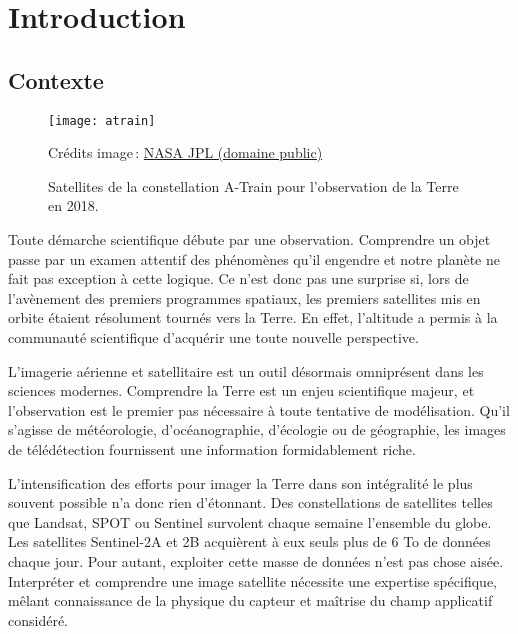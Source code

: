 \chapter{Introduction}
\label{chap:intro}
	\minitoc
	\newpage

\section{Contexte}

\begin{figure}[h]
	\texttt{[image: atrain]}
	\caption{Satellites de la constellation A-Train pour l'observation de la Terre en 2018.}
	{\small Crédits image\,: \href{https://commons.wikimedia.org/w/index.php?curid=33645603}{NASA JPL (domaine public)}}
	\label{fig:atrain}
\end{figure}

Toute démarche scientifique débute par une observation. Comprendre un objet passe par un examen attentif des phénomènes qu'il engendre et notre planète ne fait pas exception à cette logique. Ce n'est donc pas une surprise si, lors de l'avènement des premiers programmes spatiaux, les premiers satellites mis en orbite étaient résolument tournés vers la Terre. En effet, l'altitude a permis à la communauté scientifique d'acquérir une toute nouvelle perspective.

L'imagerie aérienne et satellitaire est un outil désormais omniprésent dans les sciences modernes. Comprendre la Terre est un enjeu scientifique majeur, et l'observation est le premier pas nécessaire à toute tentative de modélisation. Qu'il s'agisse de météorologie, d'océanographie, d'écologie ou de géographie, les images de télédétection fournissent une information formidablement riche.

L'intensification des efforts pour imager la Terre dans son intégralité le plus souvent possible n'a donc rien d'étonnant. Des constellations de satellites telles que \gls{Landsat}, \gls{SPOT} ou \gls{Sentinel} survolent chaque semaine l'ensemble du globe. Les satellites Sentinel-2A et 2B acquièrent à eux seuls plus de 6 To de données chaque jour. Pour autant, exploiter cette masse de données n'est pas chose aisée. Interpréter et comprendre une image satellite nécessite une expertise spécifique, mêlant connaissance de la physique du capteur et maîtrise du champ applicatif considéré.

